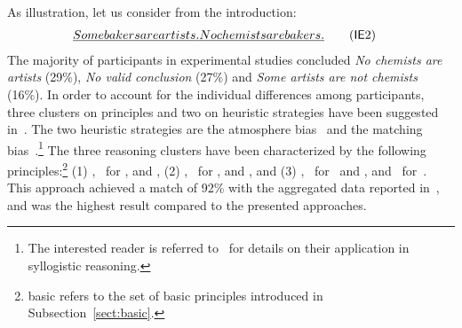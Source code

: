 \documentclass[12pt]{article}
\begin{document}
As illustration, let us consider \mbox{\MI{}} from the introduction: 
\begin{align}
 \emph{Some bakers are artists. } & \emph{No chemists are bakers.} \tag{\MI\ME 2} 
\end{align}
The majority of participants in experimental studies
concluded \emph{No chemists are artists} (29\;\%), \emph{No valid conclusion} (27\;\%)
and \emph{Some artists are not chemists} (16\;\%).
In order to account for the individual differences among participants, three clusters on principles and two on heuristic strategies have been suggested
in~\cite{declare:2017}. The two heuristic strategies are the atmosphere bias~\cite{woodworth:sells:1935} and the matching bias~\cite{Wetherick1995}.\footnote{
The interested reader is referred to~\cite{declare:2017} for details on their application in syllogistic reasoning. 
}
The three reasoning clusters have been characterized by the following principles:\footnote{{\footnotesize\textsf{basic}} refers to the set of basic principles introduced in Subsection~\ref{sect:basic}.} (1) \basic, \converse\ for \MI, and \abduction,
    (2) \basic, \converse\ for \MI, and \negFailure, and
    (3) \basic, \converse\ for \MI\ and \ME, and \contraposition\ for~\MA.
This approach achieved a match of 92\;\% with the aggregated data reported in~\cite{khemlani:2012}, and was the highest result compared to the presented approaches.
\end{document}
